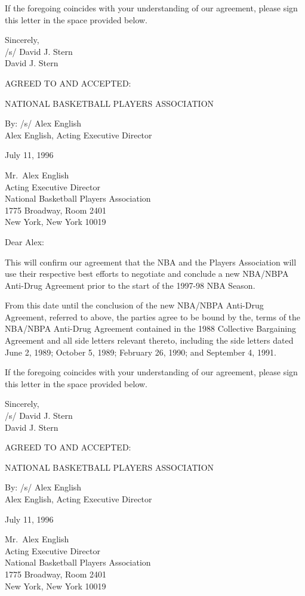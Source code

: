 \documentclass[
]{book}
\begin{document}
If the foregoing coincides with your understanding of our agreement, please sign this letter in the space provided below.

Sincerely,\\
/s/ David J. Stern\\
David J. Stern

AGREED TO AND ACCEPTED:

NATIONAL BASKETBALL PLAYERS ASSOCIATION

By:
/s/ Alex English\\
Alex English, Acting Executive Director

\newpage

July 11, 1996

Mr.~Alex English\\
Acting Executive Director\\
National Basketball Players Association\\
1775 Broadway, Room 2401\\
New York, New York 10019

Dear Alex:

This will confirm our agreement that the NBA and the Players Association will use their respective best efforts to negotiate and conclude a new NBA/NBPA Anti-Drug Agreement prior to the start of the 1997-98 NBA Season.

From this date until the conclusion of the new NBA/NBPA Anti-Drug Agreement, referred to above, the parties agree to be bound by the, terms of the NBA/NBPA Anti-Drug Agreement contained in the 1988 Collective Bargaining Agreement and all side letters relevant thereto, including the side letters dated June 2, 1989; October 5, 1989; February 26, 1990; and September 4, 1991.

If the foregoing coincides with your understanding of our agreement, please sign this letter in the space provided below.

Sincerely,\\
/s/ David J. Stern\\
David J. Stern

AGREED TO AND ACCEPTED:

NATIONAL BASKETBALL PLAYERS ASSOCIATION

By:
/s/ Alex English\\
Alex English, Acting Executive Director

\newpage

July 11, 1996

Mr.~Alex English\\
Acting Executive Director\\
National Basketball Players Association\\
1775 Broadway, Room 2401\\
New York, New York 10019
\end{document}
